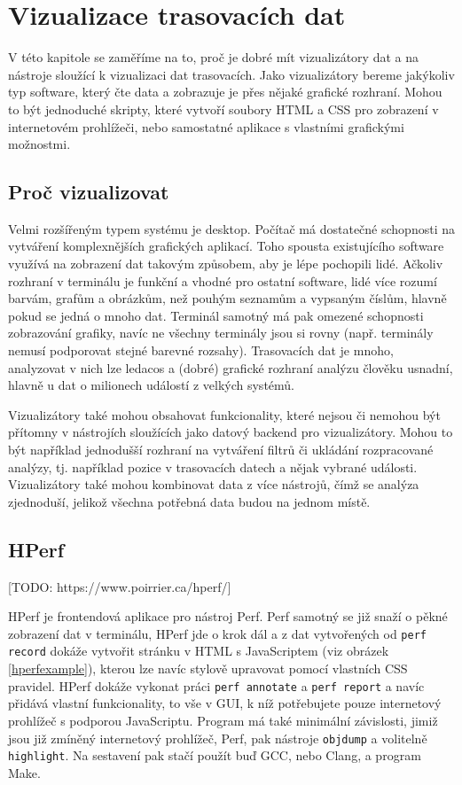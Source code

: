 \chapter{Vizualizace trasovacích dat}
\label{vizualizátory}

V této kapitole se zaměříme na to, proč je dobré mít vizualizátory dat a na nástroje sloužící k vizualizaci dat trasovacích. Jako vizualizátory bereme jakýkoliv typ software, který čte data a zobrazuje je přes nějaké grafické rozhraní. Mohou to být jednoduché skripty, které vytvoří soubory HTML a CSS pro zobrazení v internetovém prohlížeči, nebo samostatné aplikace s vlastními grafickými možnostmi.

\section{Proč vizualizovat}

Velmi rozšířeným typem systému je desktop. Počítač má dostatečné schopnosti na vytváření komplexnějších grafických aplikací. Toho spousta existujícího software využívá na zobrazení dat takovým způsobem, aby je lépe pochopili lidé. Ačkoliv rozhraní v terminálu je funkční a vhodné pro ostatní software, lidé více rozumí barvám, grafům a obrázkům, než pouhým seznamům a vypsaným číslům, hlavně pokud se jedná o mnoho dat. Terminál samotný má pak omezené schopnosti zobrazování grafiky, navíc ne všechny terminály jsou si rovny (např. terminály nemusí podporovat stejné barevné rozsahy). Trasovacích dat je mnoho, analyzovat v nich lze ledacos a (dobré) grafické rozhraní analýzu člověku usnadní, hlavně u dat o milionech událostí z velkých systémů.

Vizualizátory také mohou obsahovat funkcionality, které nejsou či nemohou být přítomny v nástrojích sloužících jako datový backend pro vizualizátory. Mohou to být například jednodušší rozhraní na vytváření filtrů či ukládání rozpracované analýzy, tj. například pozice v trasovacích datech a nějak vybrané události. Vizualizátory také mohou kombinovat data z více nástrojů, čímž se analýza zjednoduší, jelikož všechna potřebná data budou na jednom místě.

\section{HPerf}

[TODO: https://www.poirrier.ca/hperf/]

HPerf je frontendová aplikace pro nástroj Perf. Perf samotný se již snaží o pěkné zobrazení dat v terminálu, HPerf jde o krok dál a z dat vytvořených od \texttt{perf record} dokáže vytvořit stránku v HTML s JavaScriptem (viz obrázek \ref{hperfexample}), kterou lze navíc stylově upravovat pomocí vlastních CSS pravidel. HPerf dokáže vykonat práci \texttt{perf annotate} a \texttt{perf report} a navíc přidává vlastní funkcionality, to vše v GUI, k níž potřebujete pouze internetový prohlížeč s podporou JavaScriptu. Program má také minimální závislosti, jimiž jsou již zmíněný internetový prohlížeč, Perf, pak nástroje \texttt{objdump} a volitelně \texttt{highlight}. Na sestavení pak stačí použít buď GCC, nebo Clang, a program Make.


